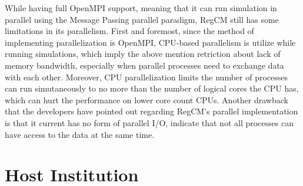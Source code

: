 While having full OpenMPI support, meaning that it can run simulation in parallel using the Message Passing parallel paradigm, RegCM still has some limitations in its parallelism. First and foremost, since the method of implementing parallelization is OpenMPI, CPU-based parallelism is utilize while running simulations, which imply the above mention retriction about lack of memory bandwidth, especially when parallel processes need to exchange data with each other. Moreover, CPU parallelization limits the number of processes can run simutaneously to no more than the number of logical cores the CPU has, which can hurt the performance on lower core count CPUs. Another drawback that the developers have pointed out regarding RegCM's parallel implementation is that it current has no form of parallel I/O, indicate that not all processes can have access to the data at the same time. \\

\section{Host Institution}

